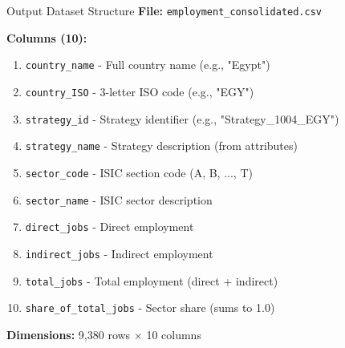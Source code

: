 \documentclass[10pt]{beamer}
\begin{document}
\begin{frame}[fragile]{Output Dataset Structure}
\textbf{File:} \texttt{employment\_consolidated.csv}

\vspace{0.3cm}

\textbf{Columns (10):}
\begin{enumerate}
    \item \texttt{country\_name} - Full country name (e.g., "Egypt")
    \item \texttt{country\_ISO} - 3-letter ISO code (e.g., "EGY")
    \item \texttt{strategy\_id} - Strategy identifier (e.g., "Strategy\_1004\_EGY")
    \item \texttt{strategy\_name} - Strategy description (from attributes)
    \item \texttt{sector\_code} - ISIC section code (A, B, ..., T)
    \item \texttt{sector\_name} - ISIC sector description
    \item \texttt{direct\_jobs} - Direct employment
    \item \texttt{indirect\_jobs} - Indirect employment
    \item \texttt{total\_jobs} - Total employment (direct + indirect)
    \item \texttt{share\_of\_total\_jobs} - Sector share (sums to 1.0)
\end{enumerate}

\vspace{0.3cm}

\textbf{Dimensions:} 9,380 rows $\times$ 10 columns
\end{frame}
\end{document}
